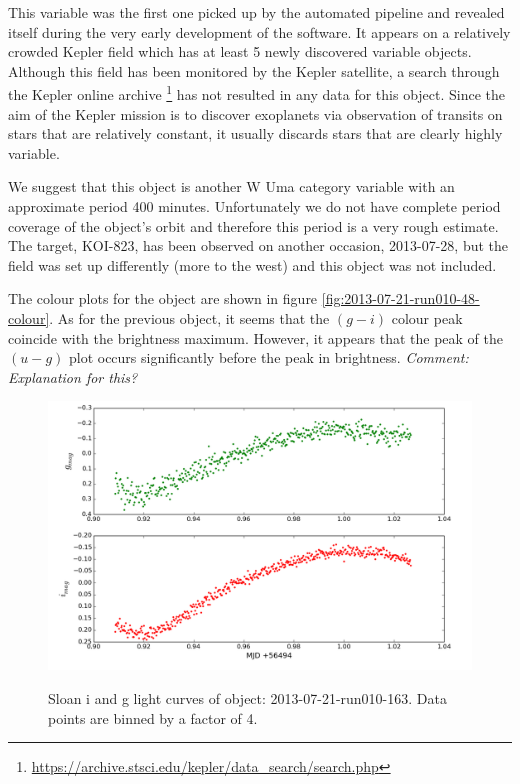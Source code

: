 This variable was the first one picked up by the automated pipeline and revealed itself during the very early development of the software. It appears on a relatively crowded Kepler field which has at least 5 newly discovered variable objects. Although this field has been monitored by the Kepler satellite, a search through the Kepler online archive \footnote{\url{https://archive.stsci.edu/kepler/data_search/search.php}} has not resulted in any data for this object. Since the aim of the Kepler mission is to discover exoplanets via observation of transits on stars that are relatively constant, it usually discards stars that are clearly highly variable. 

We suggest that this object is another {W Uma} category variable with an approximate period 400 minutes. Unfortunately we do not have complete period coverage of the object's orbit and therefore this period is a very rough estimate. The target, KOI-823, has been observed on another occasion, 2013-07-28, but the field was set up differently (more to the west) and this object was not included. 

The colour plots for the object are shown in figure \ref{fig:2013-07-21-run010-48-colour}. As for the previous object, it seems that the $(g-i)$ colour peak coincide with the brightness maximum. However, it appears that the peak of the $(u-g)$ plot occurs significantly before the peak in brightness. \emph{Comment: Explanation for this?}

\newpage

\begin{figure}
  \center
  \includegraphics[width=120mm]{images/2013-07-21-run010-163_lightcurve-bin4.png}
  \label{fig:2013-07-21-run010-163}
  \caption{Sloan i and g light curves of object: 2013-07-21-run010-163. Data points are binned by a factor of 4.}
\end{figure}


